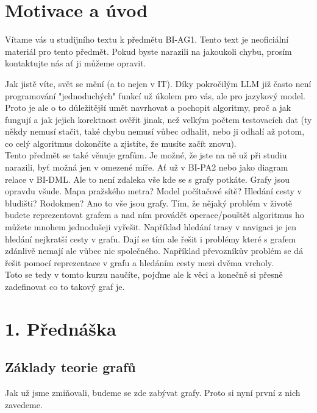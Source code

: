 
\section*{Motivace a úvod}

Vítame vás u studijního textu k předmětu BI-AG1. Tento text je neoficiální materiál pro tento předmět. Pokud byste narazili na jakoukoli chybu, prosím kontaktujte nás ať ji můžeme opravit.

Jak jistě víte, svět se mění (a to nejen v IT). Díky pokročilým LLM již často není programování "jednoduchých" funkcí už úkolem pro vás, ale pro jazykový model. Proto je ale o to důležitější umět navrhovat a pochopit algoritmy, proč a jak fungují a jak jejich korektnost ověřit jinak, než velkým počtem testovacích dat (ty někdy nemusí stačit, také chybu nemusí vůbec odhalit, nebo ji odhalí až potom, co celý algoritmus dokončíte a zjistíte, že musíte začít znovu). \\

Tento předmět se také věnuje grafům. Je možné, že jste na ně už při studiu narazili, byť možná jen v omezené míře. Ať už v BI-PA2 nebo jako diagram relace v BI-DML. Ale to není zdaleka vše kde se s grafy potkáte. Grafy jsou opravdu všude. Mapa pražského metra? Model počítačové sítě? Hledání cesty v bludišti? Rodokmen? Ano to vše jsou grafy. Tím, že nějaký problém v životě budete reprezentovat grafem a nad ním provádět operace/pouštět algoritmus ho můžete mnohem jednodušeji vyřešit. Například hledání trasy v navigaci je jen hledání nejkratší cesty v grafu. Dají se tím ale řešit i problémy které s grafem zdánlivě nemají ale vůbec nic společného. Například převozníkův problém se dá řešit pomocí reprezentace v grafu a hledáním cesty mezi dvěma vrcholy. \\

Toto se tedy v tomto kurzu naučíte, pojďme ale k věci a konečně si přesně zadefinovat co to takový graf je.

\newpage

\section{1. Přednáška}
\subsection{Základy teorie grafů}

\noindent Jak už jsme zmiňovali, budeme se zde zabývat grafy. Proto si nyní první z nich zavedeme.

